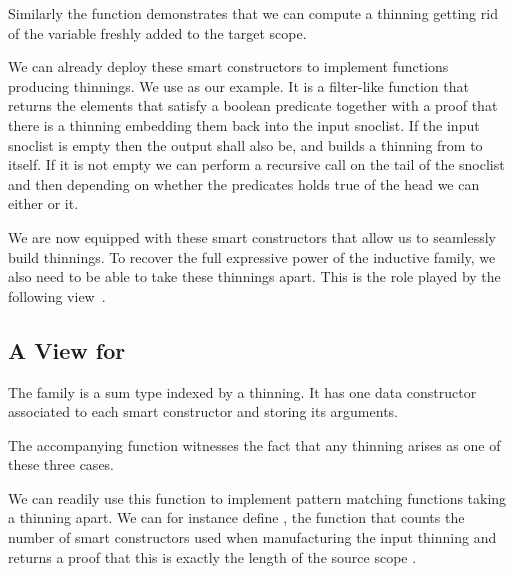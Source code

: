 \documentclass{article}
\begin{document}

Similarly the  function demonstrates that we can compute a
thinning getting rid of the variable  freshly added to the target
scope.


We can already deploy these smart constructors to implement functions producing
thinnings. We use  as our example. It is a filter-like
function that returns the elements that satisfy a boolean predicate together with
a proof that there is a thinning embedding them back into the input snoclist.
%
If the input snoclist is empty then the output shall also be, and
 builds a thinning from \IdrisData{[<]} to itself.
%
If it is not empty we can perform a recursive call on the tail of the snoclist
and then depending on whether the predicates holds true of the head we can either
 or  it.


We are now equipped with these smart constructors that allow us to seamlessly
build thinnings.
%
To recover the full expressive power of the inductive family, we also need to
be able to take these thinnings apart. This is the role played by the following
view~\cite{DBLP:journals/jfp/McBrideM04}.

\subsection{A View for }

The  family is a sum type indexed by a thinning. It has one
data constructor associated to each smart constructor and storing its arguments.


The accompanying  function witnesses the fact that any
thinning arises as one of these three cases.


We can readily use this function to implement pattern matching functions taking
a thinning apart. We can for instance define , the function
that counts the number of  smart constructors used when
manufacturing the input thinning and returns a proof that this is exactly the
length of the source scope .
\end{document}
